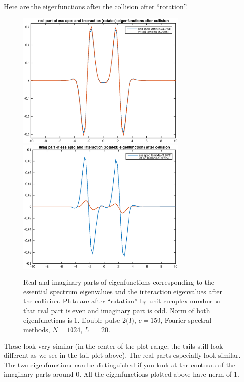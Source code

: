\documentclass[12pt]{article}
\begin{document}
Here are the eigenfunctions after the collision after ``rotation''.

\begin{figure}[H]
	\includegraphics[width=8.5cm]{eigaftercollisionrealrotate1.eps}
	\includegraphics[width=8.5cm]{eigaftercollisionimagrotate1.eps}
	\caption{Real and imaginary parts of eigenfunctions corresponding to the essential spectrum eigenvalues and the interaction eigenvalues after the collision. Plots are after ``rotation'' by unit complex number so that real part is even and imaginary part is odd. Norm of both eigenfunctions is 1. Double pulse 2(3), $c = 150$, Fourier spectral methods, $N = 1024$, $L = 120$. }
\end{figure}

These look very similar (in the center of the plot range; the tails still look different as we see in the tail plot above). The real parts especially look similar. The two eigenfunctions can be distinguished if you look at the contours of the imaginary parts around 0. All the eigenfunctions plotted above have norm of 1.
\end{document}
